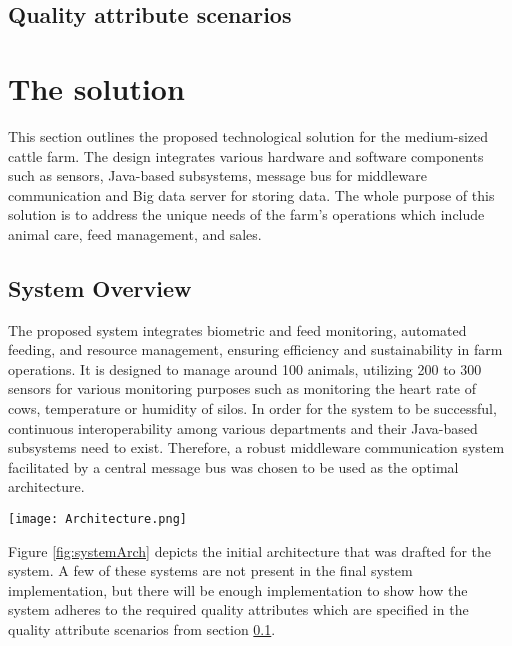 \documentclass[conference]{IEEEtran}
\begin{document}
\subsection{Quality attribute scenarios}
\label{sec:qas}










\section{The solution}
\label{sec:middleware_architecture}

This section outlines the proposed technological solution for the medium-sized cattle farm. The design integrates various hardware and software components such as sensors, Java-based subsystems, message bus for middleware communication and Big data server for storing data. The whole purpose of this solution is to address the unique needs of the farm's operations which include animal care, feed management, and sales.

\subsection{System Overview}
The proposed system integrates biometric and feed monitoring, automated feeding, and resource management, ensuring efficiency and sustainability in farm operations. It is designed to manage around 100 animals, utilizing 200 to 300 sensors for various monitoring purposes such as monitoring the heart rate of cows, temperature or humidity of silos. In order for the system to be successful, continuous interoperability among various departments and their Java-based subsystems need to exist. Therefore, a robust middleware communication system facilitated by a central message bus was chosen to be used as the optimal architecture. \newline
\begin{figure*}[!ht]
    \centering
    \texttt{[image: Architecture.png]}
    \caption{The proposed architecture}
    \label{fig:systemArch}
\end{figure*}

Figure \ref{fig:systemArch} depicts the initial architecture that was drafted for the system. A few of these systems are not present in the final system implementation, but there will be enough implementation to show how the system adheres to the required quality attributes which are specified in the quality attribute scenarios from section \ref{sec:qas}.
\end{document}

